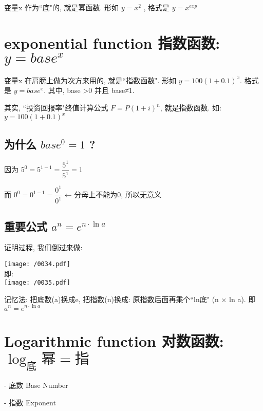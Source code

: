 \documentclass[UTF8]{ctexart}
\begin{document}
变量x 作为``底"的, 就是幂函数. 形如 $ y=x^2 $ , 格式是 $ y = x^{exp} $





\section{exponential function 指数函数:  $ y=base^x $}

变量x 在肩膀上做为次方来用的, 就是``指数函数". 形如 $ y=100(1+0.1)^x $. 格式是   $ y=base^x $. 其中, base \textgreater 0 并且 base≠1.

其实, ``投资回报率"终值计算公式 $ F=P(1+i)^n $, 就是指数函数. 如: $ y=100(1+0.1)^x $ 


\subsection{为什么 $base^0=1$ ?}

因为 $ 5^0 =5^{1-1}=\dfrac{5^1} {5^1} =1$

而 $ 0^0 =0^{1-1}=\dfrac{0^1} {0^1} $ ← 分母上不能为0, 所以无意义





\subsection{重要公式 $ \boxed{a^n=e^{n\cdot \ln a}}$}

证明过程, 我们倒过来做: \\

\begin{myEnvSample}
\texttt{[image: /0034.pdf]} \\

即: \\
\texttt{[image: /0035.pdf]}
\end{myEnvSample}

记忆法: 把底数(a)换成e, 把指数(n)换成: 原指数后面再乘个``ln底" (n × ln a).  即 $a^n=e^{n\cdot \ln a}$




\section{Logarithmic function 对数函数:  $ \log _{\text{底}}\text{幂}=\text{指} $}

- 底数 Base Number

- 指数 Exponent
\end{document}
